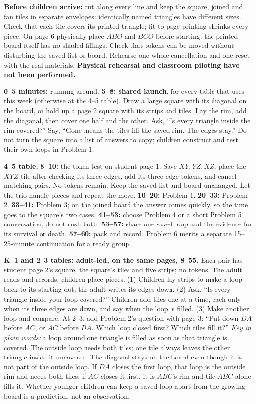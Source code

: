\documentclass[10pt,letterpaper]{article}
\newcommand{\sectiontitle}[1]{\par\vspace{5pt}{\bfseries\fontsize{12}{14}\selectfont #1}\par\nopagebreak}
\begin{document}
\textbf{Before children arrive:} cut along every line and keep the square, joined and fan tiles in separate envelopes: identically named triangles have different sizes. Check that each tile covers its printed triangle; fit-to-page printing shrinks every piece. On page 6 physically place \(ABO\) and \(BCO\) before starting: the printed board itself has no shaded fillings. Check that tokens can be moved without disturbing the saved list or board. Rehearse one whole cancellation and one reset with the real materials. \textbf{Physical rehearsal and classroom piloting have not been performed.}
\newpage
\sectiontitle{The hour}
\textbf{0--5 minutes:} running around. \textbf{5--8: shared launch}, for every table that uses this week (otherwise at the 4--5 table). Draw a large square with its diagonal on the board, or hold up a page 2 square with its strips and tiles. Lay the rim, add the diagonal, then cover one half and the other. Ask, ``Is every triangle inside the rim covered?'' Say, ``Gone means the tiles fill the saved rim. The edges stay.'' Do not turn the square into a list of answers to copy; children construct and test their own loops in Problem 1.

\textbf{4--5 table.} \textbf{8--10:} the token test on student page 1. Save \(XY,YZ,XZ\), place the \(XYZ\) tile after checking its three edges, add its three edge tokens, and cancel matching pairs. No tokens remain. Keep the saved list and board unchanged. Let the trio handle pieces and repeat the move. \textbf{10--20:} Problem 1.
\textbf{20--33:} Problem 2. \textbf{33--41:} Problem 3; on the joined board the answer comes quickly, so the time goes to the square's two cases.
\textbf{41--53:} choose Problem 4 or a short Problem 5 conversation; do not rush both.
\textbf{53--57:} share one saved loop and the evidence for its survival or death.
\textbf{57--60:} pack and record. Problem 6 merits a separate 15--25-minute continuation for a ready group.

\textbf{K--1 and 2--3 tables: adult-led, on the same pages, 8--55.} Each pair has student page 2's square, the square's tiles and five strips; no tokens. The adult reads and records; children place pieces. (1) Children lay strips to make a loop back to its starting dot; the adult writes its edges down. (2) Ask, ``Is every triangle inside your loop covered?'' Children add tiles one at a time, each only when its three edges are down, and say when the loop is filled. (3) Make another loop and compare. At 2--3, add Problem 2's question with page 3: ``Put down \(DA\) before \(AC\), or \(AC\) before \(DA\). Which loop closed first? Which tiles fill it?'' \emph{Key in plain words:} a loop around one triangle is filled as soon as that triangle is covered. The outside loop needs both tiles; one tile always leaves the other triangle inside it uncovered. The diagonal stays on the board even though it is not part of the outside loop. If \(DA\) closes the first loop, that loop is the outside rim and needs both tiles; if \(AC\) closes it first, it is \(ABC\)'s rim and tile \(ABC\) alone fills it. Whether younger children can keep a saved loop apart from the growing board is a prediction, not an observation.
\end{document}
